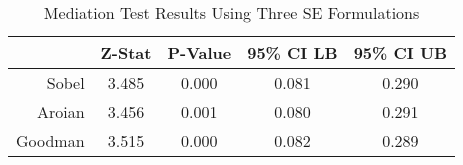 \begin{table}[ht]
\centering
\begin{tabular}{|r|c|c|c|c|}
  \hline
 & Z-Stat & P-Value & 95\% CI LB & 95\% CI UB \\ 
  \hline
Sobel & 3.485 & 0.000 & 0.081 & 0.290 \\ 
  Aroian & 3.456 & 0.001 & 0.080 & 0.291 \\ 
  Goodman & 3.515 & 0.000 & 0.082 & 0.289 \\ 
   \hline
\end{tabular}
\caption{Mediation Test Results Using Three SE Formulations} 
\end{table}